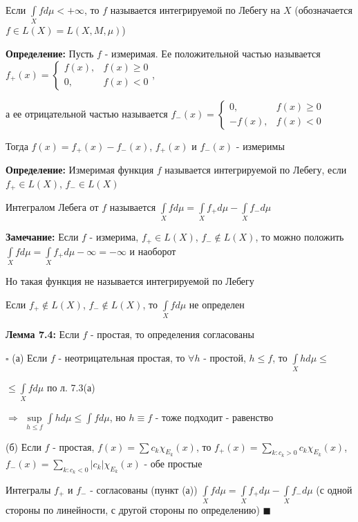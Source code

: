 \documentclass[a4paper]{report}
\begin{document}
Если $\displaystyle\int\limits_X fd\mu<+\infty$, то $f$ называется интегрируемой по Лебегу на $X$ (обозначается $f\in L(X)=L(X,M,\mu)$)
\bigskip

\noindent\textbf{Определение:} Пусть $f$ - измеримая. Ее положительной частью называется $f_+(x)=\begin{cases}f(x),&f(x)\ge0\\0,&f(x)<0\end{cases}$,

а ее отрицательной частью называется $f_-(x)=\begin{cases}0,&f(x)\ge0\\-f(x),&f(x)<0\end{cases}$

Тогда $f(x)=f_+(x)-f_-(x)$, $f_+(x)$ и $f_-(x)$ - измеримы
\bigskip

\noindent\textbf{Определение:} Измеримая функция $f$ называется интегрируемой по Лебегу, если $f_+\in L(X)$, $f_-\in L(X)$

Интегралом Лебега от $f$ называется $\displaystyle\int\limits_X fd\mu=\displaystyle\int\limits_X f_+d\mu-\displaystyle\int\limits_X f_-d\mu$
\bigskip

\noindent\textbf{Замечание:} Если $f$ - измерима, $f_+\in L(X)$, $f_-\notin L(X)$, то можно положить $\displaystyle\int\limits_X fd\mu=\displaystyle\int\limits_X f_+d\mu-\infty=-\infty$ и наоборот

Но такая функция не называется интегрируемой по Лебегу

Если $f_+\notin L(X)$, $f_-\notin L(X)$, то $\displaystyle\int\limits_X fd\mu$ не определен
\bigskip

\noindent\textbf{Лемма 7.4:} Если $f$ - простая, то определения согласованы

\noindent $\square$ (а) Если $f$ - неотрицательная простая, то $\forall h$ - простой, $h\le f$, то $\displaystyle\int\limits_X hd\mu\le$

\noindent $\le\displaystyle\int\limits_X fd\mu$ по л. 7.3(а)

$\Rightarrow$ $\sup\limits_{h\le f}\displaystyle\int hd\mu\le\displaystyle\int fd\mu$, но $h\equiv f$ - тоже подходит - равенство

(б) Если $f$ - простая, $f(x)=\sum c_k\chi_{E_k}(x)$, то $f_+(x)=\sum\limits_{k\colon c_k>0} c_k\chi_{E_k}(x)$, $f_-(x)=\sum\limits_{k\colon c_k<0}|c_k|\chi_{E_k}(x)$ - обе простые

Интегралы $f_+$ и $f_-$ - согласованы (пункт (а)) $\displaystyle\int\limits_X fd\mu=\displaystyle\int\limits_X f_+d\mu-\displaystyle\int\limits_X f_-d\mu$ (с одной стороны по линейности, с другой стороны по определению) $\blacksquare$
\bigskip
\end{document}
